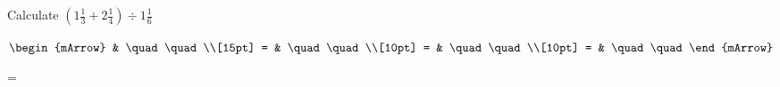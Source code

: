 \begin{mtask}
   \task \begin{exercise} Calculate $ \left(1\frac{1}{3}+ 2\frac{1}{4}\right) \div 1\frac{1}{6}  $
           \begin{envSolution}[height=8cm]
             $\begin{mArrow} 
			       & \quad \quad              \\[15pt]
                 = & \quad \quad              \\[10pt]
		   		 = & \quad \quad              \\[10pt]
				 = & \quad \quad 
              \end{mArrow}$
            \begin{shortsolution}  
			     =$ \quad \quad \quad \quad$
			\end{shortsolution}				 
           \end{envSolution}
         \end{exercise}
\end{mtask}



